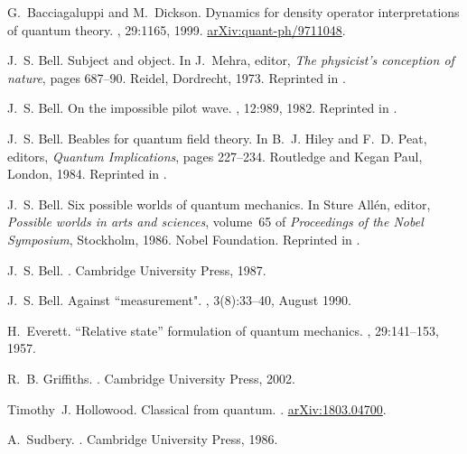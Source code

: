 \documentclass[12pt,reqno]{article}
\renewcommand{\(}{\left(}
\renewcommand{\)}{\right)}
\renewcommand{\.}{\centerdot}
\newcommand{\1}{\mathbf{1}}
\newcommand{\<}{\langle}
\renewcommand{\>}{\rangle}
\theoremstyle{definition}
\theoremstyle{remark}
\numberwithin{equation}{section}
\begin{document}
\begin{thebibliography}{10}

G.~Bacciagaluppi and M.~Dickson.
\newblock Dynamics for density operator interpretations of quantum theory.
, 29:1165, 1999.
\newblock
  \href{https://arxiv.org/abs/quant-ph/9711048}{arXiv:quant-ph/9711048}.

J.~S. Bell.
\newblock Subject and object.
\newblock In J.~Mehra, editor, {\em The physicist's conception of nature},
  pages 687--90. Reidel, Dordrecht, 1973.
\newblock Reprinted in \cite{Bell:book}.

J.~S. Bell.
\newblock On the impossible pilot wave.
, 12:989, 1982.
\newblock Reprinted in \cite{Bell:book}.

J.~S. Bell.
\newblock Beables for quantum field theory.
\newblock In B.~J. Hiley and F.~D. Peat, editors, {\em Quantum Implications},
  pages 227--234. Routledge and Kegan Paul, London, 1984.
\newblock Reprinted in \cite{Bell:book}.

J.~S. Bell.
\newblock Six possible worlds of quantum mechanics.
\newblock In Sture All\'en, editor, {\em Possible worlds in arts and sciences},
  volume~65 of {\em Proceedings of the {N}obel {S}ymposium}, Stockholm, 1986.
  {N}obel {F}oundation.
\newblock Reprinted in \cite{Bell:book}.

J.~S. Bell.
.
\newblock Cambridge University Press, 1987.

J.~S. Bell.
\newblock Against ``measurement{"}.
, 3(8):33--40, August 1990.

H.~Everett.
\newblock ``{R}elative state'' formulation of quantum mechanics.
, 29:141--153, 1957.

R.~B. Griffiths.
.
\newblock Cambridge University Press, 2002.

Timothy~J. Hollowood.
\newblock Classical from quantum.
.
\newblock \href{https://arxiv.org/abs/1803.04700}{arXiv:1803.04700}.

A.~Sudbery.
.
\newblock Cambridge University Press, 1986.


\end{thebibliography}
\end{document}
